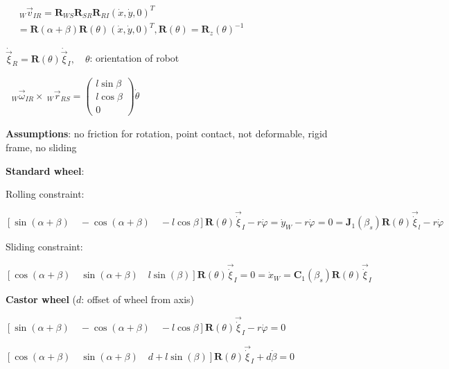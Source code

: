 \documentclass[fontsize=6pt]{scrartcl}
\newcommand{\mat}[1]{\mathbf{#1}}
\begin{document}
\begin{multicols*}{4}
\begin{minipage}{0.73\linewidth}
$
\begin{aligned}
 &~_W\vec v_{IR} = \mat R_{WS}  \mat R_{SR} \mat R_{RI} (\dot x, \dot y, 0)^T \\
 &= \mat R(\alpha + \beta) \mat R(\theta) (\dot x, \dot y, 0)^T, \mat R(\theta) = \mat R_z(\theta)^{-1}
\end{aligned}
$

$ \dot{\vec{\xi}}_R = \mat R(\theta) \dot{\vec{\xi}}_I, \quad \theta$: orientation of robot

$
\begin{aligned}
~_W\vec\omega_{IR} \times ~_W\vec{r}_{RS}
=
\begin{pmatrix}
l\sin\beta \\ l \cos\beta\\ 0
\end{pmatrix}
\dot\theta
\end{aligned}
$

\textbf{Assumptions}: no friction for rotation, point contact, not deformable, rigid frame, no sliding
\end{minipage}


\textbf{Standard wheel}:

Rolling constraint:

$\left[\sin(\alpha + \beta) \quad -\cos(\alpha + \beta) \quad -l\cos\beta\right] \mat R(\theta) \vec\dot{\xi}_I - r\dot{\varphi} = \dot y_W - r \dot{\varphi} = 0 = \mat J_1(\beta_s)\mat R(\theta) \vec\dot{\xi}_l - r\dot{\varphi}$

Sliding constraint:

$ \left[ \cos(\alpha + \beta) \quad \sin(\alpha + \beta) \quad l\sin(\beta)\right] \mat R(\theta) \vec\dot{\xi}_I = 0 = \dot{x}_W = \mat C_1(\beta_s) \mat R(\theta) \vec\dot{\xi}_I$


\textbf{Castor wheel} ($d$: offset of wheel from axis)

$ \left[\sin(\alpha + \beta) \quad -\cos(\alpha + \beta) \quad -l\cos\beta\right]\mat R(\theta) \vec\dot{\xi}_I - r\dot{\varphi} = 0$

$ \left[ \cos(\alpha + \beta) \quad \sin(\alpha + \beta) \quad d+l\sin(\beta)\right]\mat R(\theta) \vec\dot{\xi}_I + d\dot{\beta}= 0$


\end{multicols*}
\end{document}

